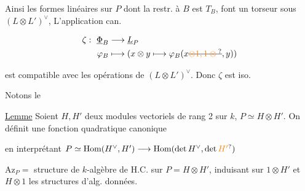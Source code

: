Ainsi les formes linéaires  sur
$P$ dont la restr. à $B$ est $T_B$, font
un torseur  sous $(L\otimes L')^\vee$, L'application
can.


\[
\begin{aligned}
\zeta:\ \underline{\Phi}_B&\longrightarrow\underline L_P\\
\varphi_B&\longmapsto (x\otimes y\longmapsto\varphi_B(x\deleted{\unsure{\otimes1,1\otimes{}}},y))
\end{aligned}
\]

est compatible avec les opérations
de $(L\otimes L')^\vee$. Donc $\zeta$ est iso.

Notons le

\uline{Lemme} Soient $H,H'$ deux modules vectoriels
de rang 2 sur $k$, $P\simeq H\otimes H'$. On définit
une fonction quadratique canonique


en interprétant $P\simeq\mathrm{Hom}(H^\vee,H')\longrightarrow\mathrm{Hom}(\det H^\vee,\det\unsure{H'})$


$\mathrm{Az}_P=$ structure de $k$-algèbre de H.C.
sur $P=H\otimes H'$, induisant sur $1\otimes H'$
et $H\otimes1$ les structures d'alg. données.


